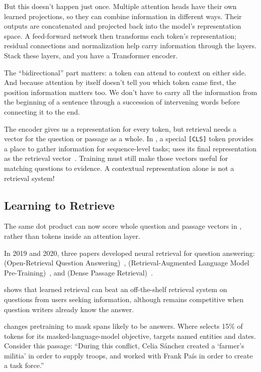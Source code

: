 But this doesn't happen just once.  Multiple attention heads have their own learned projections, so they can combine information in different ways.  Their outputs are concatenated and projected back into the model's representation space.  A feed-forward network then transforms each token's representation; residual connections and normalization help carry information through the layers.  Stack these layers, and you have a Transformer encoder.

The ``bidirectional'' part matters: a token can attend to context on either side.  And because attention by itself doesn't tell you which token came first, the position information matters too.  We don't have to carry all the information from the beginning of a sentence through a succession of intervening words before connecting it to the end.

The encoder gives us a representation for every token, but retrieval needs a vector for the question or passage as a whole.  In , a special \texttt{[CLS]} token provides a place to gather information for sequence-level tasks;  uses its final representation as the retrieval vector~\citep{karpukhin-20}.  Training must still make those vectors useful for matching questions to evidence.  A contextual representation alone is not a retrieval system!

\subsection{Learning to Retrieve}

The same dot product can now score whole question and passage vectors in , rather than tokens inside an attention layer.

In 2019 and 2020, three papers developed neural retrieval for question answering:  (Open-Retrieval Question Answering)~\citep{lee-19},  (Retrieval-Augmented Language Model Pre-Training)~\citep{guu-20}, and  (Dense Passage Retrieval)~\citep{karpukhin-20}.

 shows that learned retrieval can beat an off-the-shelf retrieval system on questions from users seeking information, although  remains competitive when question writers already know the answer.

 changes pretraining to mask spans likely to be answers.  Where  selects 15\% of tokens for its masked-language-model objective,  targets named entities and dates.  Consider this passage: ``During this conflict, Celia S\'anchez created a `farmer's militia' in order to supply troops, and worked with Frank Pa\'is in order to create a task force.''

